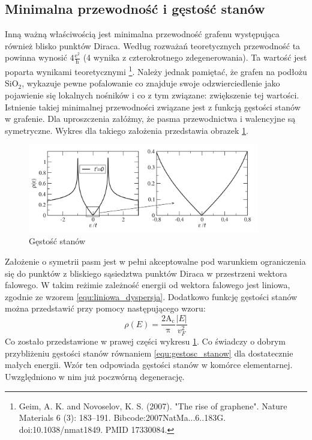 	\subsection{Minimalna przewodność i gęstość stanów}
	Inną ważną właściwością jest minimalna przewodność grafenu występująca również blisko punktów Diraca. Według 
	rozważań teoretycznych przewodność ta powinna wynosić $\mathrm{4\frac{e^2}{h}}$ (4 wynika z czterokrotnego 
	zdegenerowania). Ta wartość jest poparta wynikami teoretycznymi \footnote[9]{Geim, A. K. and Novoselov, K. S. (2007). "The rise of graphene". Nature Materials 6 (3): 183–191. Bibcode:2007NatMa...6..183G. doi:10.1038/nmat1849. PMID 17330084.}. Należy jednak pamiętać, że grafen na podłożu SiO$_2$, wykazuje pewne pofalowanie co znajduje swoje 
	odzwierciedlenie jako pojawienie się lokalnych nośników i co z tym związane: zwiększenie tej wartości. 
	Istnienie takiej minimalnej przewodności związane jest z funkcją gęstości stanów w grafenie. Dla uproszczenia 
	załóżmy, że pasma przewodnictwa i walencyjne są symetryczne. Wykres dla takiego założenia przedstawia obrazek
	\ref{fig:gestosc_stanow}.

	\vspace{-10pt}
	\begin{figure}[ht]
	\centering
	\includegraphics[width=0.90\textwidth]{./Rozdzial_2/obrazki/gestosc_stanow.jpg}
	\caption{Gęstość stanów}
	\label{fig:gestosc_stanow}
	\end{figure}
	\vspace{-10pt}

	Założenie o symetrii pasm jest w pełni akceptowalne pod warunkiem ograniczenia się
	 do punktów z bliskiego sąsiedztwa punktów Diraca w przestrzeni wektora falowego. W takim reżimie zależność
	energii od wektora falowego jest liniowa, zgodnie ze wzorem \ref{equ:liniowa_dyspersja}. 
	Dodatkowo funkcję gęstości stanów można przedstawić przy pomocy następującego wzoru:
	\begin{equation}
  	  \rho(E)=\mathrm{\frac{2A_c}{\pi}}\frac{|E|}{{ v_F^2}}
	\label{equ:gestosc_stanow}
	\end{equation}
	Co zostało przedstawione w prawej części wykresu \ref{fig:gestosc_stanow}. Co świadczy o dobrym przybliżeniu 
	gęstości stanów równaniem \ref{equ:gestosc_stanow} dla dostatecznie małych energii. Wzór ten odpowiada gęstości
	stanów w komórce elementarnej. Uwzględniono w nim już poczwórną degenerację.

